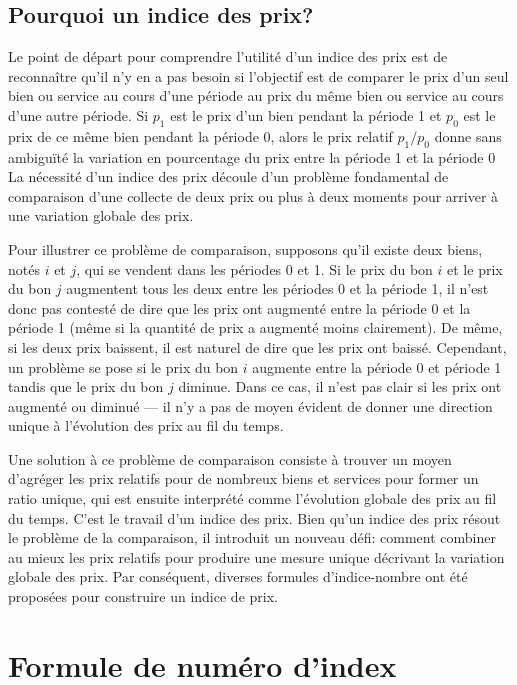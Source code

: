 \documentclass[
]{article}
\begin{document}
\hypertarget{pourquoi-un-indice-des-prix}{%
\subsection{Pourquoi un indice des prix?}\label{pourquoi-un-indice-des-prix}}

Le point de départ pour comprendre l'utilité d'un indice des prix est de reconnaître qu'il n'y en a pas besoin si l'objectif est de comparer le prix d'un seul bien ou service au cours d'une période au prix du même bien ou service au cours d'une autre période. Si \(p_1\) est le prix d'un bien pendant la période 1 et \(p_0\) est le prix de ce même bien pendant la période 0, alors le prix relatif \(p_1 / p_0\) donne sans ambiguïté la variation en pourcentage du prix entre la période 1 et la période 0 La nécessité d'un indice des prix découle d'un problème fondamental de comparaison d'une collecte de deux prix ou plus à deux moments pour arriver à une variation globale des prix.

Pour illustrer ce problème de comparaison, supposons qu'il existe deux biens, notés \(i\) et \(j\), qui se vendent dans les périodes 0 et 1. Si le prix du bon \(i\) et le prix du bon \(j\) augmentent tous les deux entre les périodes 0 et la période 1, il n'est donc pas contesté de dire que les prix ont augmenté entre la période 0 et la période 1 (même si la quantité de prix a augmenté moins clairement). De même, si les deux prix baissent, il est naturel de dire que les prix ont baissé. Cependant, un problème se pose si le prix du bon \(i\) augmente entre la période 0 et
période 1 tandis que le prix du bon \(j\) diminue. Dans ce cas, il n'est pas clair si les prix ont augmenté ou diminué --- il n'y a pas de moyen évident de donner une direction unique à l'évolution des prix au fil du temps.

Une solution à ce problème de comparaison consiste à trouver un moyen d'agréger les prix relatifs pour de nombreux biens et services pour former un ratio unique, qui est ensuite interprété comme l'évolution globale des prix au fil du temps. C'est le travail d'un indice des prix. Bien qu'un indice des prix résout le problème de la comparaison, il introduit un nouveau défi: comment combiner au mieux les prix relatifs pour produire une mesure unique décrivant la variation globale des prix. Par conséquent, diverses formules d'indice-nombre ont été proposées pour construire un indice de prix.

\hypertarget{formule-de-numuxe9ro-dindex}{%
\section{Formule de numéro d'index}\label{formule-de-numuxe9ro-dindex}}
\end{document}
